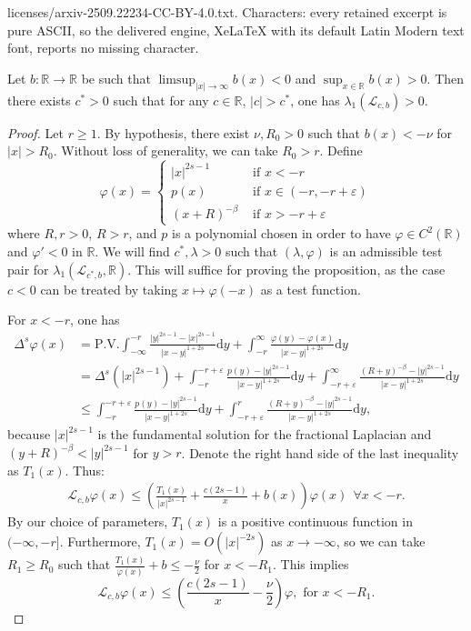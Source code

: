 \documentclass[10pt,a4paper]{amsart}
\newcommand{\Lop}{\mathcal{L}}
\newcommand{\PV}{\mathrm{P.V.}}
\newcommand{\R}{\mathbb{R}}
\newcommand{\dy}{\mathrm{d}y}
\renewcommand{\epsilon}{\varepsilon}
\renewcommand{\phi}{\varphi}
\begin{document}
licenses/arxiv-2509.22234-CC-BY-4.0.txt. Characters: every retained excerpt is pure ASCII, so the delivered engine, XeLaTeX with its default Latin Modern text font, reports no missing character.
\begin{prop}
\label{prop:upper_threshold}
Let $b:\R\rightarrow \R$ be such that $\limsup_{|x|\rightarrow \infty} b(x) < 0$ and $\sup_{x\in \R} b(x) > 0$. Then there exists $c^* >0$ such that for any $c \in \R$, $|c| > c^*$, one has $\lambda_1(\Lop_{c,b}) > 0$. 
\end{prop}

\begin{proof}
Let $r\geq 1$. By hypothesis, there exist $\nu, R_0 >0$ such that $b(x) < - \nu$ for $|x| > R_0$. Without loss of generality, we can take $R_0 > r$. Define 
\[\phi(x) = \begin{cases}
|x|^{2s-1} & \text{ if } x < -r \\
p(x) & \text{ if } x  \in (-r, - r + \epsilon )\\
(x+ R)^{-\beta} & \text{ if } x > - r + \epsilon
\end{cases} \]
where $R, r > 0$, $R> r$, and $p$ is a polynomial chosen in order to have $\phi \in C^2(\R)$ and $\phi' < 0$ in $\R$. We will find $c^*, \lambda>0$ such that $(\lambda, \phi)$ is an admissible test pair for $\lambda_1(\Lop_{c^*,b},\R)$. This will suffice for proving the proposition, as the case $c <0$ can be treated by taking $x\mapsto \phi(-x)$ as a test function.

For $x<-r$, one has 
\begin{align*}
\Delta^s\phi(x) &= \PV \int_{-\infty}^{-r} \frac{|y|^{2s-1} - |x|^{2s-1}}{|x-y|^{1+2s}}\dy + \int_{-r}^{\infty} \frac{\phi(y) - \phi(x)}{|x-y|^{1+2s}}\dy \\
&= \Delta^s(|x|^{2s-1}) +\int_{-r}^{-r+\epsilon} \frac{p(y) - |y|^{2s-1}}{|x-y|^{1+2s}}\dy + \int_{-r +\epsilon}^{\infty} \frac{(R+y)^{-\beta} - |y|^{2s-1}}{|x-y|^{1+2s}}\dy \\
&\leq \int_{-r}^{-r+\epsilon} \frac{p(y) - |y|^{2s-1}}{|x-y|^{1+2s}}\dy + \int_{-r+\epsilon}^{r} \frac{(R+y)^{-\beta} - |y|^{2s-1}}{|x-y|^{1+2s}}\dy,
\end{align*}
because $|x|^{2s-1}$ is the fundamental solution for the fractional Laplacian and $(y+R)^{-\beta} < |y|^{2s-1}$ for $y>r$. Denote the right hand side of the last inequality as $T_1(x)$. Thus:
\begin{align*}
\Lop_{c,b} \phi(x) \leq \left( \frac{T_1(x)}{|x|^{2s-1}} + \frac{c(2s-1)}{x} + b(x)\right)\phi(x) ~~\forall x<-r.
\end{align*}
By our choice of parameters, $T_1(x)$ is a positive continuous function in $(-\infty, -r]$. Furthermore, $T_1(x) = O(|x|^{-2s})$ as $x\rightarrow -\infty$, so we can take $R_1 \geq R_0$ such that $\frac{T_1(x)}{\phi(x)} + b \leq -\frac{\nu}{2}$ for $x < -R_1$. This implies 
\begin{equation}
\label{eq:bound_left}
\Lop_{c, b} \phi(x) \leq \left(\frac{c(2s-1)}{x} - \frac{\nu}{2}\right) \phi, \text{ for } x<-R_1.
\end{equation} 


\end{proof}
\end{document}
